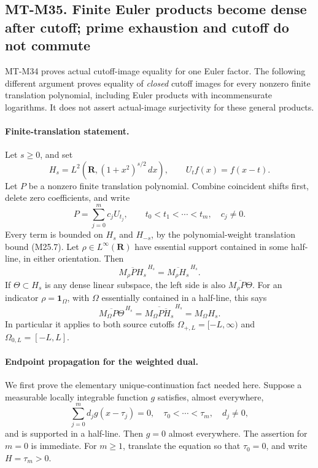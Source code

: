 \subsection*{MT-M35. Finite Euler products become dense after cutoff;
prime exhaustion and cutoff do not commute}

MT-M34 proves actual cutoff-image equality for one Euler
factor.  The following different argument proves equality
of \emph{closed} cutoff images for every nonzero finite
translation polynomial, including Euler products with
incommensurate logarithms.  It does not assert actual-image
surjectivity for these general products.

\paragraph{Finite-translation statement.}
Let $s\ge0$, and set
\[
 H_s=L^2(\mathbf R,(1+x^2)^{s/2}\,dx),\qquad
 U_tf(x)=f(x-t).
 \tag{M35.1}
\]
Let $P$ be a nonzero finite translation polynomial.  Combine
coincident shifts first, delete zero coefficients, and write
\[
                P=\sum_{j=0}^{m}c_jU_{t_j},\qquad
          t_0<t_1<\cdots<t_m,\quad c_j\ne0.
 \tag{M35.2}
\]
Every term is bounded on $H_s$ and $H_{-s}$, by the
polynomial-weight translation bound (M25.7).
Let $\rho\in L^\infty(\mathbf R)$ have essential support
contained in some half-line, in either orientation.  Then
\[
 \overline{M_\rho P H_s}^{\,H_s}
                 =\overline{M_\rho H_s}^{\,H_s}.
 \tag{M35.3}
\]
If $\Theta\subset H_s$ is any dense linear subspace,
the left side is also $\overline{M_\rho P\Theta}$.
For an indicator $\rho=\mathbf1_\Omega$, with $\Omega$
essentially contained in a half-line, this says
\[
 \overline{M_\Omega P\Theta}^{\,H_s}
      =\overline{M_\Omega\overline{P H_s}}^{\,H_s}
      =M_\Omega H_s.
 \tag{M35.4}
\]
In particular it applies to both source cutoffs
$\Omega_{+,L}=[-L,\infty)$ and $\Omega_{0,L}=[-L,L]$.

\paragraph{Endpoint propagation for the weighted dual.}
We first prove the elementary unique-continuation fact
needed here.  Suppose a measurable locally integrable
function $g$ satisfies, almost everywhere,
\[
                 \sum_{j=0}^{m}d_jg(x-\tau_j)=0,
 \quad \tau_0<\cdots<\tau_m,\quad d_j\ne0,
 \tag{M35.5}
\]
and is supported in a half-line.  Then $g=0$ almost
everywhere.  The assertion for $m=0$ is immediate.
For $m\ge1$, translate the equation so that $\tau_0=0$,
and write $H=\tau_m>0$.

